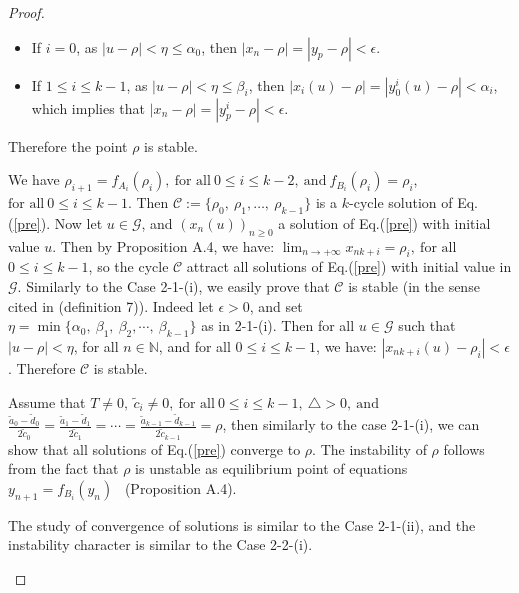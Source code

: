 \documentclass[11pt]{amsart}
\theoremstyle{definition}
\theoremstyle{remark}
\theoremstyle{example}
\numberwithin{equation}{section}
\begin{document}
\begin{proof}
\begin{description}[leftmargin=*]
\begin{itemize}[leftmargin=*]
\item If $i=0$, as $|u-\rho|<\eta\leq\alpha_0$, then $|x_n-\rho|=|y_p-\rho|<\epsilon$.
\item If $1\leq i\leq k-1$, as $|u-\rho|<\eta\leq\beta_i$, then $|x_i(u)-\rho|=|y_0^i(u)-\rho|<\alpha_i$, which implies
that $|x_n-\rho|=|y_p^i-\rho|<\epsilon$.
\end{itemize}
Therefore the point $\rho$ is stable.
\medskip

\item[(2-1)-(ii)] We have $\rho_{i+1}=f_{A_i}(\rho_i), \ \text{for all} \ 0\leq i\leq k-2, \ \text{and} \ f_{B_i}(\rho_i)=\rho_i$,\\ $\text{for all} \ 0\leq i\leq k-1$. Then $\mathcal{C}:=\{\rho_0, \ \rho_1,\ldots,
\ \rho_{k-1}\}$ is a $k$-cycle solution of Eq.(\ref{pre}). Now let $u \in \mathcal{G}$, and $(x_n(u))_{n\geq0}$ a
solution of Eq.(\ref{pre}) with initial value $u$. Then by Proposition A.4,
we have: $\displaystyle{\lim_{n\rightarrow+\infty}x_{nk+i}=\rho_i, \ \text{for all}}$\\ $0\leq i \leq k-1$, so the cycle  $\mathcal{C}$ attract all solutions of Eq.(\ref{pre}) with initial value in $\mathcal{G}$. Similarly to
the Case 2-1-(i), we easily prove that $\mathcal{C}$ is stable (in
the sense cited in \cite{2} (definition 7)). Indeed let $\epsilon>0$,
and set \\$\eta=\min\{\alpha_0, \ \beta_1, \ \beta_2,\cdots, \ \beta_{k-1}\}$ as in 2-1-(i). Then for all
$u \in \mathcal{G}$ such that $|u-\rho|<\eta$, for all $n \in \mathbb{N}$, and for all $0\leq i\leq k-1$, we have: $|x_{nk+i}(u)-\rho_i|<\epsilon$. Therefore $\mathcal{C}$ is stable.
\medskip

\item[(2-2)-(i)] Assume that $T\neq0, \ \tilde{c}_i\neq0, \ \text{for all} \ 0\leq i\leq k-1, \ \triangle>0, \ \text{and}$\\
$\frac{\tilde{a}_0-\tilde{d}_0}{2\tilde{c}_0}=
\frac{\tilde{a}_1-\tilde{d}_1}{2\tilde{c}_1}=
\cdots=\frac{\tilde{a}_{k-1}-\tilde{d}_{k-1}}{2\tilde{c}_{k-1}}=\rho$, then similarly to the case 2-1-(i),
we can show that all solutions of Eq.(\ref{pre}) converge to $\rho$.
The instability of $\rho$ follows from the fact that $\rho$ is unstable as equilibrium point of equations $y_{n+1}=f_{B_i}(y_n)$ \ (Proposition A.4).
\medskip

\item[(2-2)-(ii)]The study of convergence of solutions is similar to the Case 2-1-(ii), and the instability character is similar to the Case 2-2-(i).
\medskip


\end{description}
\end{proof}
\end{document}
